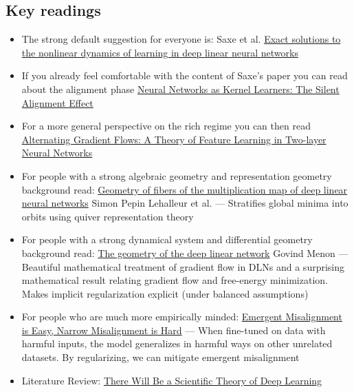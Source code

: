 \documentclass[11pt]{article}
\begin{document}
\subsection*{Key readings}
\begin{itemize}
  \item The strong default suggestion for everyone is: Saxe et al. \href{https://arxiv.org/abs/1312.6120}{Exact solutions to the nonlinear dynamics of learning in deep linear neural networks}
  \item If you already feel comfortable with the content of Saxe's paper you can read about the alignment phase \href{https://arxiv.org/abs/2111.00034}{Neural Networks as Kernel Learners: The Silent Alignment Effect}
  \item For a more general perspective on the rich regime you can then read \href{https://arxiv.org/abs/2506.06489}{Alternating Gradient Flows: A Theory of Feature Learning in Two-layer Neural Networks}
  \item For people with a strong algebraic geometry and representation geometry background read: \href{https://arxiv.org/abs/2411.19920}{Geometry of fibers of the multiplication map of deep linear neural networks} Simon Pepin Lehalleur et al. --- Stratifies global minima into orbits using quiver representation theory
  \item For people with a strong dynamical system and differential geometry background read: \href{https://arxiv.org/abs/2411.09004}{The geometry of the deep linear network} Govind Menon --- Beautiful mathematical treatment of gradient flow in DLNs and a surprising mathematical result relating gradient flow and free-energy minimization. Makes implicit regularization explicit (under balanced assumptions)
  \item For people who are much more empirically minded: \href{https://arxiv.org/abs/2602.07852}{Emergent Misalignment is Easy, Narrow Misalignment is Hard} --- When fine-tuned on data with harmful inputs, the model generalizes in harmful ways on other unrelated datasets. By regularizing, we can mitigate emergent misalignment
  \item Literature Review: \href{https://arxiv.org/abs/2604.21691}{There Will Be a Scientific Theory of Deep Learning}
\end{itemize}
\end{document}
